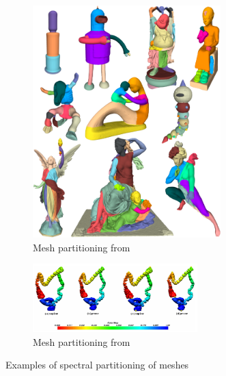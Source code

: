 \documentclass[11pt]{article}
\begin{document}
\begin{figure}
    \centering
    \begin{subfigure}[t]{0.5\textwidth}
        \centering
        \includegraphics[width=0.8\textwidth]{figures/spectral_partitioning.png}
        \caption{Mesh partitioning from \cite{bao2023spectral}}
    \end{subfigure}\hfill

    \vspace{1cm}
    \begin{subfigure}[t]{0.7\textwidth}
        \centering
        \includegraphics[width=0.7\textwidth]{figures/fielder_vector_colon.png}
        \caption{Mesh partitioning from \cite{10.1007/978-3-642-15705-9_41}}
   \end{subfigure}
    \caption{Examples of spectral partitioning of meshes}
    \label{fig:spectral_part}
\end{figure}

\newpage
\printbibliography
\end{document}
